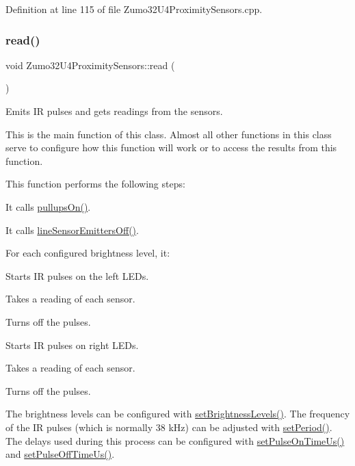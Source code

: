Definition at line 115 of file Zumo32\+U4\+Proximity\+Sensors.\+cpp.

\mbox{\label{class_zumo32_u4_proximity_sensors_a071d935e10e2a16a3ae2559d16a12683}} 
\subsubsection{\texorpdfstring{read()}{read()}}
{\footnotesize\ttfamily void Zumo32\+U4\+Proximity\+Sensors\+::read (\begin{DoxyParamCaption}{ }\end{DoxyParamCaption})}



Emits IR pulses and gets readings from the sensors. 

This is the main function of this class. Almost all other functions in this class serve to configure how this function will work or to access the results from this function.

This function performs the following steps\+:


\begin{DoxyEnumerate}
\item It calls \hyperlink{class_zumo32_u4_proximity_sensors_ae596289faf5921bc7c199cf73edf534e}{pullups\+On()}.
\item It calls \hyperlink{class_zumo32_u4_proximity_sensors_a583dada6ad676cbda2ec7d55b05338b8}{line\+Sensor\+Emitters\+Off()}.
\item For each configured brightness level, it\+:
\begin{DoxyEnumerate}
\item Starts IR pulses on the left L\+E\+Ds.
\item Takes a reading of each sensor.
\item Turns off the pulses.
\item Starts IR pulses on right L\+E\+Ds.
\item Takes a reading of each sensor.
\item Turns off the pulses.
\end{DoxyEnumerate}
\end{DoxyEnumerate}

The brightness levels can be configured with \hyperlink{class_zumo32_u4_proximity_sensors_a47820baf67dfa58dedb41cb7bb26dc65}{set\+Brightness\+Levels()}. The frequency of the IR pulses (which is normally 38 k\+Hz) can be adjusted with \hyperlink{class_zumo32_u4_proximity_sensors_ab288aeae9bcc5933cede8941b709b4fc}{set\+Period()}. The delays used during this process can be configured with \hyperlink{class_zumo32_u4_proximity_sensors_aeb626f226420976e774d93dd2a83e768}{set\+Pulse\+On\+Time\+Us()} and \hyperlink{class_zumo32_u4_proximity_sensors_a4d7911aca58734a76be212de103a1387}{set\+Pulse\+Off\+Time\+Us()}.

